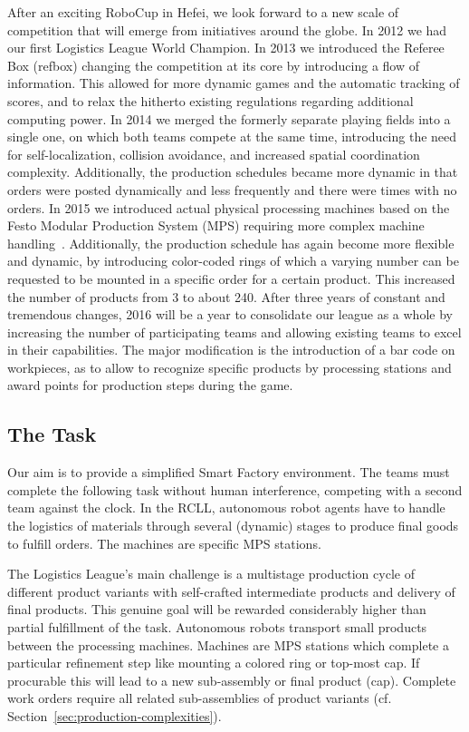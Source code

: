 \documentclass[12pt,twoside]{article}
\newcommand{\refsec}[1]{Section~\ref{#1}}
\begin{document}
After an exciting RoboCup in Hefei, we look forward to a new scale of
competition that will emerge from initiatives around the globe. In
2012 we had our first Logistics League World Champion.  In 2013 we
introduced the Referee Box (refbox) changing the competition at its
core by introducing a flow of information. This allowed for more
dynamic games and the automatic tracking of scores, and to relax the
hitherto existing regulations regarding additional computing power. In
2014 we merged the formerly separate playing fields into a single one,
on which both teams compete at the same time, introducing the need for
self-localization, collision avoidance, and increased spatial
coordination complexity. Additionally, the production schedules became
more dynamic in that orders were posted dynamically and less
frequently and there were times with no orders. In 2015 we introduced
actual physical processing machines based on the Festo Modular
Production System (MPS) requiring more complex machine
handling~\cite{wdrl2013}. Additionally, the production schedule has
again become more flexible and dynamic, by introducing color-coded
rings of which a varying number can be requested to be mounted in a
specific order for a certain product. This increased the number of
products from 3 to about 240. After three years of constant and
tremendous changes, 2016 will be a year to consolidate our league as a
whole by increasing the number of participating teams and allowing
existing teams to excel in their capabilities. The major modification
is the introduction of a bar code on workpieces, as to allow to
recognize specific products by processing stations and award points
for production steps during the game.

\subsection{The Task}
\label{sec:task}

Our aim is to provide a simplified Smart Factory environment. The
teams must complete the following task without human interference,
competing with a second team against the clock. In the RCLL,
autonomous robot agents have to handle the logistics of materials
through several (dynamic) stages to produce final goods to fulfill
orders. The machines are specific MPS stations.

The Logistics League's main challenge is a multistage production cycle
of different product variants with self-crafted intermediate products
and delivery of final products. This genuine goal will be rewarded
considerably higher than partial fulfillment of the task. Autonomous
robots transport small products between the processing
machines. Machines are MPS stations which complete a particular
refinement step like mounting a colored ring or top-most cap. If
procurable this will lead to a new sub-assembly or final product
(cap). Complete work orders require all related sub-assemblies of
product variants (cf. \refsec{sec:production-complexities}).
\end{document}
